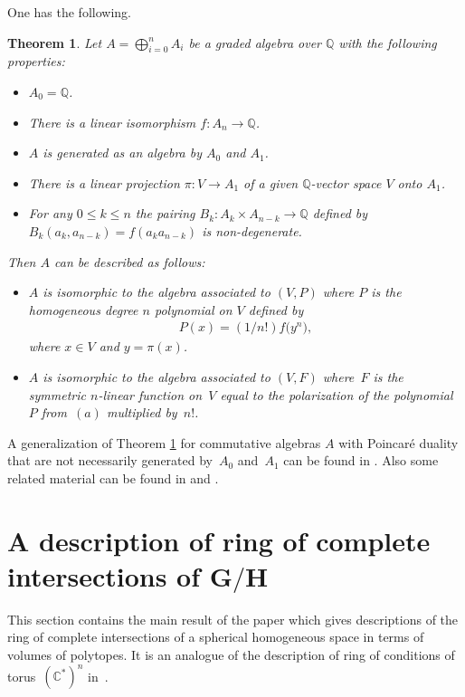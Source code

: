 \documentclass[10pt,a4paper]{amsart}
\def \C{\mathbb{C}}
\def \Q{\mathbb{Q}}
\numberwithin{equation}{section}
\newtheorem{Th}{Theorem}[section]
\theoremstyle{definition}
\begin{document}
One has the following.
\begin{Th} \label{th-ring-of-diff-op}
Let $A = \bigoplus_{i=0}^n A_i$ be a graded algebra over $\Q$ with the following properties:
\begin{itemize}\itemsep=0pt
\item[$(1)$] $A_0=\Q$.
\item[$(2)$] There is a linear isomorphism $f\colon A_n \to \Q$.
\item[$(3)$] $A$ is generated as an algebra by $A_0$ and $A_1$.
\item[$(4)$] There is a linear projection $\pi\colon V\to A_1$ of a given $\Q$-vector space $V$ onto $A_1$.
\item[$(5)$] For any $0\leq k\leq n$ the pairing $B_k\colon A_k \times A_{n-k} \to \Q$ defined by $B_k(a_k,a_{n-k})=f(a_ka_{n-k})$ is non-degenerate.
\end{itemize}
Then $A$ can be described as follows:
\begin{itemize}\itemsep=0pt
\item[$(a)$] $A$ is isomorphic to the algebra associated to $(V, P)$ where $P$ is the homogeneous degree $n$ polynomial on $V$ defined by
\begin{gather*} P(x)=(1/n!) f\big(y^n\big),\end{gather*}
where $x\in V$ and $y=\pi(x)$.
\item[$(b)$] $A$ is isomorphic to the algebra associated to $(V, F)$ where~$F$ is the symmetric $n$-linear function on~$V$ equal to the polarization of the polynomial~$P$ from~$(a)$ multiplied by~$n!$.
\end{itemize}
\end{Th}

A generalization of Theorem \ref{th-ring-of-diff-op} for commutative algebras $A$ with Poincar\'{e} duality that are not necessarily generated by~$A_0$ and~$A_1$ can be found in \cite{EstKhKaz}. Also some related material can be found in \cite[Exercise~21.7]{Eisenbud} and \cite{Kaveh-note}.

\section[A description of ring of complete intersections of $G/H$]{A description of ring of complete intersections of $\boldsymbol{G/H}$} \label{sec-descp-ring-comp-int}

This section contains the main result of the paper which gives descriptions of the ring of complete intersections of a spherical homogeneous space in terms of volumes of polytopes. It is an analogue of the description of ring of conditions of torus~$(\C^*)^n$ in~\cite{Kaz-Khov}.
\end{document}
